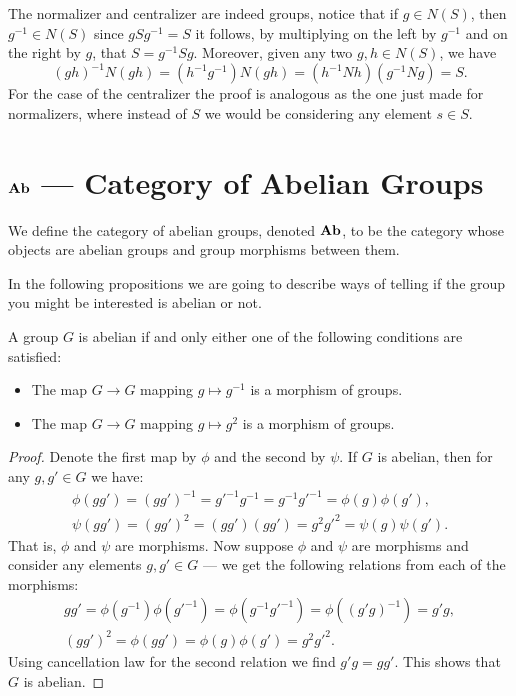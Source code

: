 The normalizer and centralizer are indeed groups, notice that if \(g \in N(S)\),
then \(g^{-1} \in N(S)\) since \(g S g^{-1} = S\) it follows, by multiplying on
the left by \(g^{-1}\) and on the right by \(g\), that \(S = g^{-1} S
g\). Moreover, given any two \(g, h \in N(S)\), we have
\[
  (g h)^{-1} N (g h) = (h^{-1} g ^{-1}) N (g h) = (h^{-1}N h) (g^{-1} N g) = S.
\]
For the case of the centralizer the proof is analogous as the one just made for
normalizers, where instead of \(S\) we would be considering any element \(s \in
S\).


\section{\texorpdfstring{\({\textbf{Ab}}\)}{Ab} --- Category of Abelian Groups}

\begin{definition}
We define the category of abelian groups, denoted \({\textbf{Ab}}\), to be the category
whose objects are abelian groups and group morphisms between them.
\end{definition}

In the following propositions we are going to describe ways of telling if the
group you might be interested is abelian or not.

\begin{proposition}
A group \(G\) is abelian if and only either one of the following conditions
are satisfied:
\begin{itemize}
  \setlength\itemsep{0em}
  \item The map \(G \to G\) mapping \(g \mapsto g^{-1}\) is a morphism of
    groups.
  \item The map \(G \to G\) mapping \(g \mapsto g^2\) is a morphism of groups.
\end{itemize}
\end{proposition}

\begin{proof}
Denote the first map by \(\phi\) and the second by \(\psi\). If \(G\) is
abelian, then for any \(g, g' \in G\) we have:
\begin{gather*}
  \phi(gg') = (gg')^{-1} = g'^{-1} g^{-1} = g^{-1}g'^{-1} = \phi(g) \phi(g'),
  \\
  \psi(gg') = (gg')^2 = (gg')(gg') = g^2g'^2 = \psi(g)\psi(g').
\end{gather*}
That is, \(\phi\) and \(\psi\) are morphisms. Now suppose \(\phi\) and
\(\psi\) are morphisms and consider any elements \(g, g' \in G\) --- we get
the following relations from each of the morphisms:
\begin{gather*}
  gg' = \phi(g^{-1})\phi(g'^{-1}) = \phi(g^{-1}g'^{-1})
  = \phi((g'g)^{-1}) = g'g,
  \\
  (gg')^2 = \phi(gg') = \phi(g) \phi(g') = g^2 g'^2.
\end{gather*}
Using cancellation law for the second relation we find \(g'g = gg'\). This
shows that \(G\) is abelian.
\end{proof}

